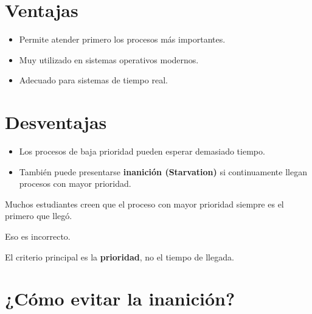 \documentclass[
  spanish,
  letterpaper,
]{scrbook}
\providecommand{\tightlist}{%
  \setlength{\itemsep}{0pt}\setlength{\parskip}{0pt}}
\begin{document}
\chapter{Ventajas}\label{ventajas-5}

\begin{itemize}
\tightlist
\item
  Permite atender primero los procesos más importantes.
\item
  Muy utilizado en sistemas operativos modernos.
\item
  Adecuado para sistemas de tiempo real.
\end{itemize}


\chapter{Desventajas}\label{desventajas-2}

\begin{itemize}
\tightlist
\item
  Los procesos de baja prioridad pueden esperar demasiado tiempo.
\item
  También puede presentarse \textbf{inanición (Starvation)} si
  continuamente llegan procesos con mayor prioridad.
\end{itemize}

\begin{tcolorbox}[enhanced jigsaw, arc=.35mm, bottomrule=.15mm, bottomtitle=1mm, breakable, colback=white, colbacktitle=quarto-callout-warning-color!10!white, colframe=quarto-callout-warning-color-frame, coltitle=black, left=2mm, leftrule=.75mm, opacityback=0, opacitybacktitle=0.6, rightrule=.15mm, title=\textcolor{quarto-callout-warning-color}{\faExclamationTriangle}\hspace{0.5em}{Error común}, titlerule=0mm, toprule=.15mm, toptitle=1mm]

Muchos estudiantes creen que el proceso con mayor prioridad siempre es
el primero que llegó.

Eso es incorrecto.

El criterio principal es la \textbf{prioridad}, no el tiempo de llegada.

\end{tcolorbox}


\chapter{¿Cómo evitar la
inanición?}\label{cuxf3mo-evitar-la-inaniciuxf3n}
\end{document}
